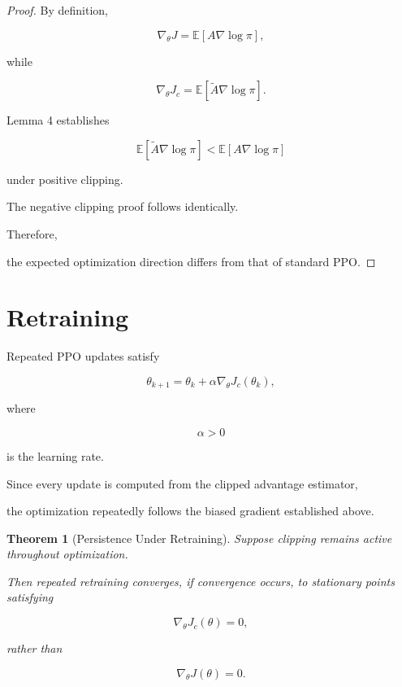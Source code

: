 \documentclass[11pt]{article}
\newtheorem{theorem}{Theorem}
\begin{document}
\begin{proof}

By definition,

\[
\nabla_\theta J
=
\mathbb E
[
A
\nabla\log\pi
],
\]

while

\[
\nabla_\theta J_c
=
\mathbb E
[
\widetilde A
\nabla\log\pi
].
\]

Lemma 4 establishes

\[
\mathbb E
[
\widetilde A
\nabla\log\pi
]
<
\mathbb E
[
A
\nabla\log\pi
]
\]

under positive clipping.

The negative clipping proof follows identically.

Therefore,

the expected optimization direction differs from that of
standard PPO.

\end{proof}


\section{Retraining}

Repeated PPO updates satisfy

\[
\theta_{k+1}
=
\theta_k
+
\alpha
\nabla_\theta J_c(\theta_k),
\]

where

\[
\alpha>0
\]

is the learning rate.

Since every update is computed from the clipped advantage estimator,

the optimization repeatedly follows the biased gradient established
above.


\begin{theorem}[Persistence Under Retraining]

Suppose clipping remains active throughout optimization.

Then repeated retraining converges, if convergence occurs,
to stationary points satisfying

\[
\nabla_\theta J_c(\theta)=0,
\]

rather than

\[
\nabla_\theta J(\theta)=0.
\]

\end{theorem}
\end{document}

